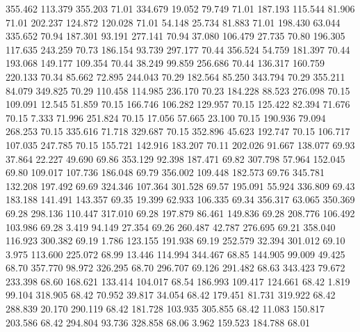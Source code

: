  355.462  113.379  355.203        71.01
 334.679   19.052   79.749        71.01
 187.193  115.544   81.906        71.01
 202.237  124.872  120.028        71.01
  54.148   25.734   81.883        71.01
 198.430   63.044  335.652        70.94
 187.301   93.191  277.141        70.94
  37.080  106.479   27.735        70.80
 196.305  117.635  243.259        70.73
 186.154   93.739  297.177        70.44
 356.524   54.759  181.397        70.44
 193.068  149.177  109.354        70.44
  38.249   99.859  256.686        70.44
 136.317  160.759  220.133        70.34
  85.662   72.895  244.043        70.29
 182.564   85.250  343.794        70.29
 355.211   84.079  349.825        70.29
 110.458  114.985  236.170        70.23
 184.228   88.523  276.098        70.15
 109.091   12.545   51.859        70.15
 166.746  106.282  129.957        70.15
 125.422   82.394   71.676        70.15
   7.333   71.996  251.824        70.15
  17.056   57.665   23.100        70.15
 190.936   79.094  268.253        70.15
 335.616   71.718  329.687        70.15
 352.896   45.623  192.747        70.15
 106.717  107.035  247.785        70.15
 155.721  142.916  183.207        70.11
 202.026   91.667  138.077        69.93
  37.864   22.227   49.690        69.86
 353.129   92.398  187.471        69.82
 307.798   57.964  152.045        69.80
 109.017  107.736  186.048        69.79
 356.002  109.448  182.573        69.76
 345.781  132.208  197.492        69.69
 324.346  107.364  301.528        69.57
 195.091   55.924  336.809        69.43
 183.188  141.491  143.357        69.35
  19.399   62.933  106.335        69.34
 356.317   63.065  350.369        69.28
 298.136  110.447  317.010        69.28
 197.879   86.461  149.836        69.28
 208.776  106.492  103.986        69.28
   3.419   94.149   27.354        69.26
 260.487   42.787  276.695        69.21
 358.040  116.923  300.382        69.19
   1.786  123.155  191.938        69.19
 252.579   32.394  301.012        69.10
   3.975  113.600  225.072        68.99
  13.446  114.994  344.467        68.85
 144.905   99.009   49.425        68.70
 357.770   98.972  326.295        68.70
 296.707   69.126  291.482        68.63
 343.423   79.672  233.398        68.60
 168.621  133.414  104.017        68.54
 186.993  109.417  124.661        68.42
   1.819   99.104  318.905        68.42
  70.952   39.817   34.054        68.42
 179.451   81.731  319.922        68.42
 288.839   20.170  290.119        68.42
 181.728  103.935  305.855        68.42
  11.083  150.817  203.586        68.42
 294.804   93.736  328.858        68.06
   3.962  159.523  184.788        68.01
